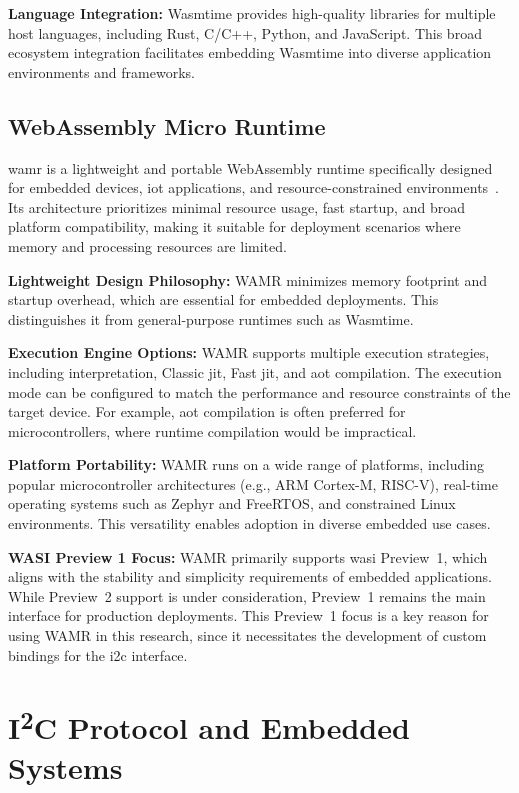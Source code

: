 \textbf{Language Integration:} Wasmtime provides high-quality libraries for multiple host languages, including Rust, C/C++, Python, and JavaScript. This broad ecosystem integration facilitates embedding Wasmtime into diverse application environments and frameworks.

\subsection{WebAssembly Micro Runtime}
\label{subsec:wamr}

\acrfull{wamr} is a lightweight and portable WebAssembly runtime specifically designed for embedded devices, \acrshort{iot} applications, and resource-constrained environments~\cite{wamr_project, wamr_project2}. Its architecture prioritizes minimal resource usage, fast startup, and broad platform compatibility, making it suitable for deployment scenarios where memory and processing resources are limited.

\textbf{Lightweight Design Philosophy:} WAMR minimizes memory footprint and startup overhead, which are essential for embedded deployments. This distinguishes it from general-purpose runtimes such as Wasmtime.

\textbf{Execution Engine Options:} WAMR supports multiple execution strategies, including interpretation, Classic \acrshort{jit}, Fast \acrshort{jit}, and \acrshort{aot} compilation. The execution mode can be configured to match the performance and resource constraints of the target device. For example, \acrshort{aot} compilation is often preferred for microcontrollers, where runtime compilation would be impractical.

\textbf{Platform Portability:} WAMR runs on a wide range of platforms, including popular microcontroller architectures (e.g., ARM Cortex-M, RISC-V), real-time operating systems such as Zephyr and FreeRTOS, and constrained Linux environments. This versatility enables adoption in diverse embedded use cases.

\textbf{WASI Preview 1 Focus:} WAMR primarily supports \acrshort{wasi} Preview~1, which aligns with the stability and simplicity requirements of embedded applications. While Preview~2 support is under consideration, Preview~1 remains the main interface for production deployments. This Preview~1 focus is a key reason for using WAMR in this research, since it necessitates the development of custom bindings for the \acrshort{i2c} interface.


\section{I\textsuperscript{2}C Protocol and Embedded Systems}
\label{sec:i2c-embedded}

